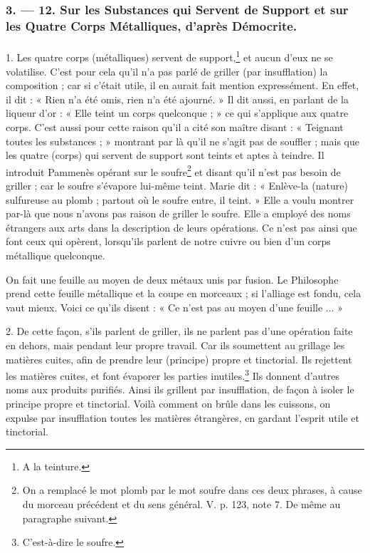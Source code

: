 \documentclass[a4paper, 11pt, oneside, polutonikogreek, french]{article}
\begin{document}
\bigskip
\centerline{\EightStarTaper}
\centerline{\EightStarTaper\EightStarTaper}
\bigskip

\subsubsection{3. --- 12. Sur les Substances qui Servent de Support et sur les Quatre Corps Métalliques, d'après Démocrite.}
\paragraph{}
1. Les quatre corps (métalliques) servent de support,\footnote{A la teinture.} et aucun d'eux ne se volatilise. C'est pour cela qu'il n'a pas parlé de griller (par insufflation) la composition ; car si c'était utile, il en aurait fait mention expressément. En effet, il dit : « Rien n'a été omis, rien n'a été ajourné. » Il dit aussi, en parlant de la liqueur d'or : « Elle teint un corps quelconque ; » ce qui s'applique aux quatre corps. C'est aussi pour cette raison qu'il a cité son maître disant : « Teignant toutes les substances ; » montrant par là qu'il ne s'agit pas de souffler ; mais que les quatre (corps) qui servent de support sont teints et aptes à teindre. Il introduit Pammenès opérant sur le soufre\footnote{On a remplacé le mot plomb par le mot soufre dans ces deux phrases, à cause du morceau précédent et du sens général. V. p. 123, note 7. De même au paragraphe suivant.} et disant qu'il n'est pas besoin de griller ; car le soufre s'évapore lui-même teint. Marie dit : « Enlève-la (nature) sulfureuse au plomb ; partout où le soufre entre, il teint. » Elle a voulu montrer par-là que nous n'avons pas raison de griller le soufre. Elle a employé des noms étrangers aux arts dans la description de leurs opérations. Ce n'est pas ainsi que font ceux qui opèrent, lorsqu'ils parlent de notre cuivre ou bien d'un corps métallique quelconque.

On fait une feuille au moyen de deux métaux unis par fusion. Le Philosophe prend cette feuille métallique et la coupe en morceaux ; si l'alliage est fondu, cela vaut mieux. Voici ce qu'ils disent : « Ce n'est pas au moyen d'une feuille ... »

2. De cette façon, s'ils parlent de griller, ils ne parlent pas d'une opération faite en dehors, mais pendant leur propre travail. Car ils soumettent au grillage les matières cuites, afin de prendre leur (principe) propre et tinctorial. Ils rejettent les matières cuites, et font évaporer les parties inutiles.\footnote{C'est-à-dire le soufre.} Ils donnent d'autres noms aux produits purifiés. Ainsi ils grillent par insufflation, de façon à isoler le principe propre et tinctorial. Voilà comment on brûle dans les cuissons, on expulse par insufflation toutes les matières étrangères, en gardant l'esprit utile et tinctorial.
\end{document}
